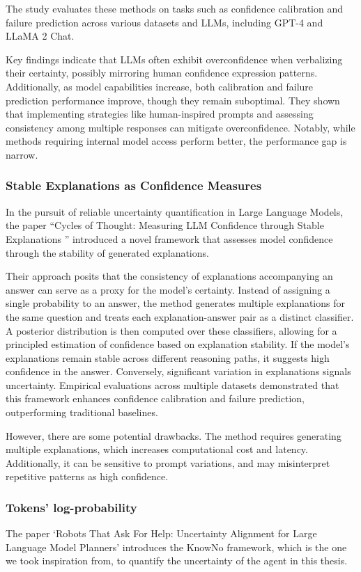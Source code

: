 The study evaluates these methods on tasks such as confidence calibration and
failure prediction across various datasets and LLMs, including GPT-4 and LLaMA 2
Chat.

Key findings indicate that LLMs often exhibit overconfidence when verbalizing their
certainty, possibly mirroring human confidence expression patterns. Additionally,
as model capabilities increase, both calibration and failure prediction performance
improve, though they remain suboptimal. They shown that implementing strategies like
human-inspired prompts and assessing consistency among multiple responses can mitigate
overconfidence. Notably, while methods requiring internal model access perform better,
the performance gap is narrow.

\subsubsection{Stable Explanations as Confidence Measures}
In the pursuit of reliable uncertainty quantification in Large Language Models, the
paper ``Cycles of Thought: Measuring LLM Confidence through Stable Explanations
'' \cite{becker2024cyclesthoughtmeasuringllm} introduced a novel framework that assesses
model confidence through the stability of generated explanations.

Their approach posits that the consistency of explanations accompanying an answer
can serve as a proxy for the model's certainty. Instead of assigning a single
probability to an answer, the method generates multiple explanations for the same
question and treats each explanation-answer pair as a distinct classifier. A
posterior distribution is then computed over these classifiers, allowing for a principled
estimation of confidence based on explanation stability. If the model's
explanations remain stable across different reasoning paths, it suggests high confidence
in the answer. Conversely, significant variation in explanations signals uncertainty.
Empirical evaluations across multiple datasets demonstrated that this framework
enhances confidence calibration and failure prediction, outperforming traditional
baselines.

However, there are some potential drawbacks. The method requires generating multiple
explanations, which increases computational cost and latency. Additionally, it
can be sensitive to prompt variations, and may misinterpret repetitive patterns as
high confidence.

\subsubsection{Tokens' log-probability}
\label{ssub:tokens_log_probability} The paper `Robots That Ask For Help: Uncertainty
Alignment for Large Language Model Planners'
\cite{ren2023robotsaskhelpuncertainty} introduces the KnowNo framework, which is
the one we took inspiration from, to quantify the uncertainty of the agent in
this thesis.

